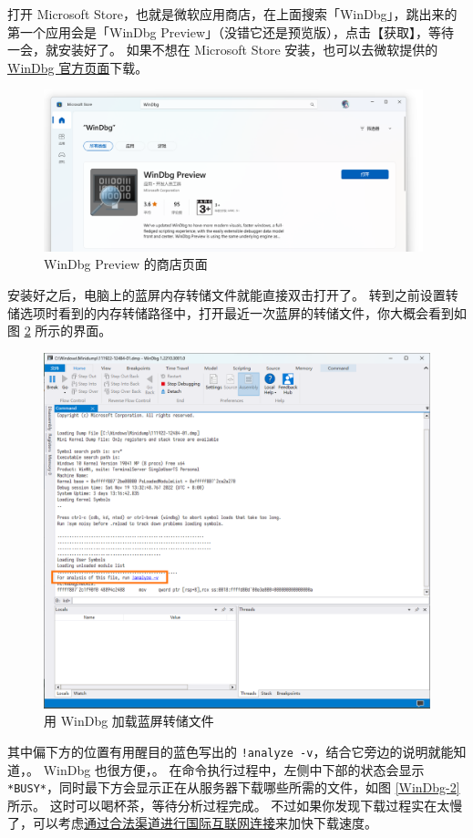 打开 Microsoft Store，也就是微软应用商店，在上面搜索「WinDbg」，跳出来的第一个应用会是「WinDbg Preview」（没错它还是预览版），点击【获取】，等待一会，就安装好了。
如果不想在 Microsoft Store 安装，也可以去微软提供的 \href{https://learn.microsoft.com/zh-cn/windows-hardware/drivers/debugger/}{WinDbg 官方页面}下载。

\begin{figure}[htb!]
  \centering
  \includegraphics[width=11cm]{assets/WinDbg.png}
  \caption{WinDbg Preview 的商店页面}
  \label{WinDbg}
\end{figure}

安装好之后，电脑上的蓝屏内存转储文件就能直接双击打开了。
转到之前设置转储选项时看到的内存转储路径中，打开最近一次蓝屏的转储文件，你大概会看到如图 \ref{WinDbg-1} 所示的界面。

\begin{figure}[htb!]
  \centering
  \includegraphics[width=.83\textwidth]{assets/WinDbg-1.png}
  \caption{用 WinDbg 加载蓝屏转储文件}
  \label{WinDbg-1}
\end{figure}

其中偏下方的位置有用醒目的蓝色写出的 \verb|!analyze -v|，结合它旁边的说明就能知道，。
WinDbg 也很方便，。
在命令执行过程中，左侧中下部的状态会显示 \verb|*BUSY*|，同时最下方会显示正在从服务器下载哪些所需的文件，如图 \ref{WinDbg-2} 所示。
这时可以喝杯茶，等待分析过程完成。
不过如果你发现下载过程实在太慢了，可以考虑\href{https://www.12377.cn/xzfg/2020/7f441527_web.html}{通过合法渠道进行国际互联网连接}来加快下载速度。

